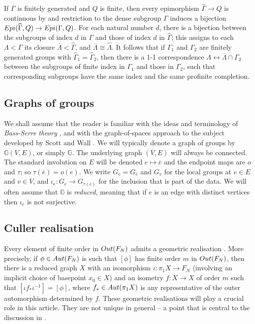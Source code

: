 \documentclass[11pt, a4 paper]{amsart}
\numberwithin{equation}{section}
\theoremstyle{remark}
\theoremstyle{definition}
\def\G{\Gamma}
\def\-{\overline}
\def\wh{\widehat}
\def\GG{\mathbb{G}}
\def\-{\overline}
\def\G{\Gamma}
\begin{document}
If $\G$ is finitely generated and $Q$ is finite, 
then every epimorphism $\wh{\G}\to Q$ is continuous 
by \cite{nikolov2003finite} 
and restriction to the dense subgroup $\G$ induces a bijection 
${\rm{Epi}}(\wh{\G},Q)\to {\rm{Epi}}({\G},Q)$. 
For each natural number $d$, 
there is a bijection between the subgroups of index $d$ in $\G$ 
and those of index $d$ in $\wh{\G}$; 
this assigns to each $\Lambda<\G$ 
its closure $\overline{\Lambda}<\wh{\G}$, 
and $\overline{\Lambda}\cong\wh{\Lambda}$. 
It follows that 
if $\G_1$ and $\G_2$ are finitely generated groups 
with $\wh{\G}_1=\wh{\G}_2$, 
then there is a 1-1 correspondence 
$\Lambda\leftrightarrow \overline{\Lambda}\cap \G_2$ 
between the subgroups of finite index in $\G_1$ 
and those in $\G_2$, 
such that corresponding subgroups have the same index 
and the same profinite completion. 


\subsection{Graphs of groups}

We shall assume that the reader is familiar 
with the ideas and terminology of {\em Bass-Serre theory} 
\cite{serre1980trees}, 
and with the graph-of-spaces approach to the subject 
developed by Scott and Wall \cite{scott1979topological}. 
We will typically denote a graph of groups by $\GG (V, E)$, 
or simply $\GG$. 
The underlying  graph $(V, E)$ will always be connected. 
The standard involution on $E$ will be denoted 
$e\mapsto \overline{e}$ 
and the endpoint maps are $o$ and $\tau$; 
so $\tau(\overline{e})=o(e)$. 
We write $G_e=G_{\-e}$ and $G_v$ 
for the local groups at $e\in E$ and $v\in V$, 
and $\iota_e : G_e\to G_{\tau(e)}$ 
for the inclusion that is part of the data. 
We will often assume that $\GG$ is {\em reduced}, 
meaning that if $e$ is an edge with distinct vertices 
then $\iota_e$ is not surjective. 


\subsection{Culler realisation}

Every element of finite order in ${\rm{Out}}(F_N)$ 
admits a geometric realisation \cite{culler1984finite}. 
More precisely, if $\phi\in{\rm{Aut}}(F_N)$ is such that  
$[\phi]$ has finite order $m$ in ${\rm{Out}}(F_N)$,
then there is a reduced graph $X$ 
with an isomorphism $\iota:\pi_1X\to F_N$ 
(involving an implicit choice of basepoint $x_0\in X$) 
and an isometry $f : X\to X$ of order $m$ 
such that $[\iota f_* \iota^{-1}] = [\phi]$, 
where $f_*\in {\rm{Aut}}(\pi_1X)$ is any representative 
of the outer automorphism determined by $f$. 
These geometric realisations 
will play a crucial role in this article. 
They are not unique in general 
-- a point that is central to the discussion in . 
\end{document}
